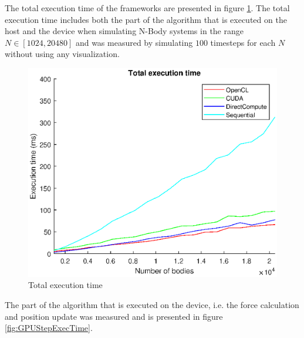 %

The total execution time of the frameworks are presented in figure \ref{fig:GraphTotExecTime}. The total execution time includes both the part of the algorithm that is executed on the host and the device when simulating N-Body systems in the range $N \in [1024, 20480]$ and was measured by simulating $100$ timesteps for each $N$ without using any visualization. 

\begin{figure}[H]
    \centering
    \includegraphics[width=\textwidth]{Results/Figs/TotExecTime.eps}
    \caption{Total execution time}
    \label{fig:GraphTotExecTime}
\end{figure}

The part of the algorithm that is executed on the device, i.e. the force calculation and position update was measured and is presented in figure \ref{fig:GPUStepExecTime}.

